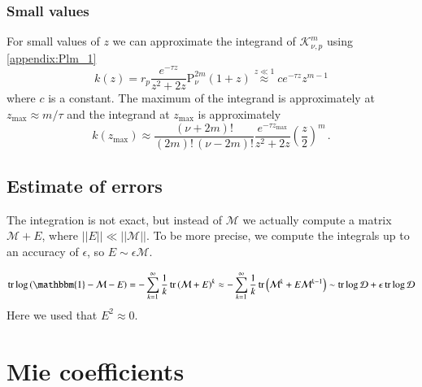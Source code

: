 \documentclass[superscriptaddress,prb]{revtex4-1}
\newcommand{\e}{e}    %
\newcommand{\Id}{\mathbbm{1}} %
\DeclareMathOperator{\trace}{tr}
\newcommand{\Plm}[2]{{\text{P}_{#1}^{#2}}}
\newcommand{\tmax}{{\text{max}}}
\begin{document}
\subsubsection{Small values}
For small values of $z$ we can approximate the integrand of
$\mathcal{K}_{\nu,p}^m$ using \eqref{appendix:Plm_1}
\begin{equation}
k(z) = r_p \frac{\e^{-\tau z}}{z^2+2z} \Plm{\nu}{2m}(1+z) \overset{z \ll 1}{\approx} c \e^{-\tau z} z^{m-1}
\end{equation}
where $c$ is a constant. The maximum of the integrand is approximately at $z_\tmax \approx m/\tau$ and the
integrand at $z_\tmax$ is approximately
\begin{equation}
k(z_\tmax) \approx \frac{(\nu+2m)!}{(2m)! \, (\nu-2m)!} \frac{\e^{-\tau z_\tmax}}{z^2+2z} \left(\frac{z}{2}\right)^m \,.
\end{equation}


\subsection{Estimate of errors}

The integration is not exact, but instead of $\mathcal{M}$ we actually compute
a matrix $\mathcal{M}+E$, where $||E|| \ll ||\mathcal{M}||$. To be more precise,
we compute the integrals up to an accuracy of $\epsilon$, so $E\sim \epsilon \mathcal{M}$.

\begin{equation}
\trace\log\left(\Id-\mathcal{M}-E\right) = - \sum_{k=1}^\infty \frac{1}{k} \trace\left(\mathcal{M}+E\right)^k
\approx
- \sum_{k=1}^\infty \frac{1}{k} \trace\left(\mathcal{M}^k+E\mathcal{M}^{k-1}\right)
\sim \trace\log\mathcal{D} + \epsilon\trace\log\mathcal{D}
\end{equation}
Here we used that $E^2\approx0$.

\section{Mie coefficients}
\end{document}
